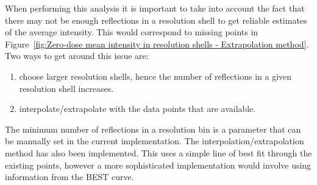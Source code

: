 When performing this analysis it is important to take into account the fact that there may not be enough reflections in a resolution shell to get reliable estimates of the average intensity.
This would correspond to missing points in Figure~\ref{fig:Zero-dose mean intensity in resolution shells - Extrapolation method}.
Two ways to get around this issue are:
\begin{enumerate}
    \item choose larger resolution shells, hence the number of reflections in a given resolution shell increases.
    \item interpolate/extrapolate with the data points that are available.
\end{enumerate}
The minimum number of reflections in a resolution bin is a parameter that can be manually set in the current implementation. The interpolation/extrapolation method has also been implemented.
This uses a simple line of best fit through the existing points, however a more sophisticated implementation would involve using information from the BEST curve.

